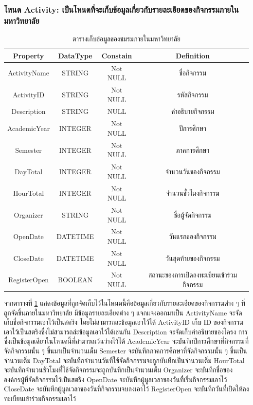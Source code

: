\documentclass[14pt,oneside,openright,a4paper]{cpe-thai-project}
\begin{document}
    \subsubsection{โหนด Activity: เป็นโหนดที่จะเก็บข้อมูลเกี่ยวกับรายละเอียดของกิจกรรมภายในมหาวิทยาลัย}
    \begin{table}[!h]\centering
      \begin{tabular}{|c|c|c|c|}
      \hline
      \rowcolor[HTML]{9FC5E8} 
      Property     & DataType & Constain & Definition                              \\ \hline
      ActivityName & STRING   & Not NULL & ชื่อกิจกรรม                            \\ \hline
      ActivityID   & STRING   & Not NULL & รหัสกิจกรรม                              \\ \hline
      Description  & STRING   & NULL     & คำอธิบายกิจกรรม                         \\ \hline
      AcademicYear & INTEGER  & Not NULL & ปีการศึกษา                              \\ \hline
      Semester     & INTEGER  & Not NULL & ภาคการศึกษา                             \\ \hline
      DayTotal     & INTEGER  & Not NULL & จำนวนวันของกิจกรรม                      \\ \hline
      HourTotal    & INTEGER  & Not NULL & จำนวนชั่วโมงกิจกรรม                     \\ \hline
      Organizer    & STRING   & Not NULL & ชื่อผู้จัดกิจกรรม                       \\ \hline
      OpenDate     & DATETIME & Not NULL & วันแรกของกิจกรรม                        \\ \hline
      CloseDate    & DATETIME & Not NULL & วันสุดท้ายของกิจกรรม                    \\ \hline
      RegisterOpen & BOOLEAN  & Not NULL & สถานะของการเปิดลงทะเบียนเข้าร่วมกิจกรรม \\ \hline
      \end{tabular}
      \caption{\centering ตารางเก็บข้อมูลของชมรมภายในมหาวิทยาลัย}\label{tab:Activitynode}
    \end{table}
    จากตารางที่ \ref{tab:Activitynode} แสดงข้อมูลที่ถูกจัดเก็บไว้ในโหนดนี้คือข้อมูลเกี่ยวกับรายละเอียดของกิจกรรมต่าง ๆ ที่ถูกจัดขึ้นภายในมหาวิทยาลัย มีข้อมูลรายละเอียดต่าง ๆ แจกแจงออกมาเป็น ActivityName จะจัดเก็บชื่อกิจกรรมเอาไว้เป็นสตริง โดยไม่สามารถละข้อมูลเอาไว้ได้ ActivityID เก็บ ID ของกิจกรรมเอาไว้เป็นสตริงซึ่งไม่สามารถล่ะข้อมูลเอาไว้ได้เช่นกัน Description จะจัดเก็บคำอธิบายของโครง
    การซึ่งเป็นข้อมูลเดียวในโหนดนี้ที่สามารถเว้นว่างไว้ได้ AcademicYear จะบันทึกปีการศึกษาที่กิจกรรมที่จัดกิจกรรมนั้น ๆ ขึ้นมาเป็นจำนวนเต็ม Semester จะบันทึกภาคการศึกษาที่จัดกิจกรรมนั้น ๆ ขึ้นเป็นจำนวนเต็ม DayTotal จะบันทึกจำนวนวันที่ใช้จัดกิจกรรมจะถูกบันทึกเป็นจำนวนเต็ม HourTotal จะบันทึกจำนวนชั่วโมงที่ใช้จัดกิจกรรมจะถูกบันทึกเป็นจำนวนเต็ม Organizer จะบันทึกชื่อขององค์กรผู้ที่จัดกิจกรรมไว้เป็นสตริง OpenDate จะบันทึกผู้มูลเวลาของวันที่เริ่มกิจกรรมเอาไว้ CloseDate จะบันทึกผู้มูลเวลาของวันที่กิจกรรมจบลงเอาไว้ RegisterOpen จะบันทึกวันที่เปิดให้ลงทะเบียนเข้าร่วมกิจกรรมเอาไว้
    \newpage
\end{document}
